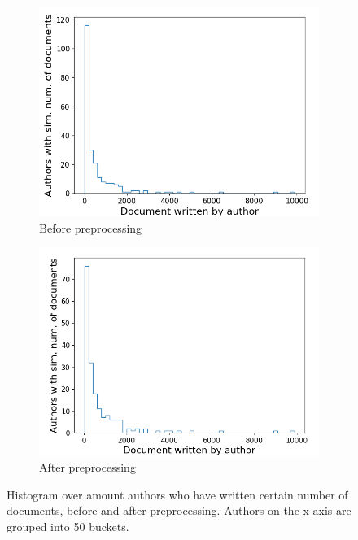 \begin{figure}[ht]
	\centering
	\begin{subfigure}{0.45\textwidth}
		\centering
		\includegraphics[width=\linewidth]{figures/author_hist2_before.png}
		\caption{Before preprocessing}
		\label{fig:author_hist_before}
	\end{subfigure}
	\begin{subfigure}{0.45\textwidth}
		\centering
		\includegraphics[width=\linewidth]{figures/author_hist2_14.png}
		\caption{After preprocessing}
		\label{fig:auhtor_hist_after}
	\end{subfigure}
	\caption{Histogram over amount authors who have written certain number of documents, before and after preprocessing.
	Authors on the x-axis are grouped into 50 buckets.}
	\label{fig:author_hist}
\end{figure}

